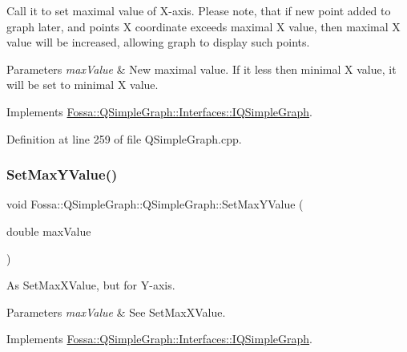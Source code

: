 Call it to set maximal value of X-\/axis. Please note, that if new point added to graph later, and point\textquotesingle{}s X coordinate exceeds maximal X value, then maximal X value will be increased, allowing graph to display such points. 


\begin{DoxyParams}{Parameters}
{\em max\+Value} & New maximal value. If it less then minimal X value, it will be set to minimal X value. \\
\hline
\end{DoxyParams}


Implements \hyperlink{class_fossa_1_1_q_simple_graph_1_1_interfaces_1_1_i_q_simple_graph_a04e7ec46c2be46257bef53c7bf978a2a}{Fossa\+::\+Q\+Simple\+Graph\+::\+Interfaces\+::\+I\+Q\+Simple\+Graph}.



Definition at line 259 of file Q\+Simple\+Graph.\+cpp.

\mbox{\label{class_fossa_1_1_q_simple_graph_1_1_q_simple_graph_a6cb6eee80dc489f300e32263833cf1cd}} 
\subsubsection{\texorpdfstring{Set\+Max\+Y\+Value()}{SetMaxYValue()}}
{\footnotesize\ttfamily void Fossa\+::\+Q\+Simple\+Graph\+::\+Q\+Simple\+Graph\+::\+Set\+Max\+Y\+Value (\begin{DoxyParamCaption}\item[{double}]{max\+Value }\end{DoxyParamCaption})\hspace{0.3cm}{\ttfamily [virtual]}}



As Set\+Max\+X\+Value, but for Y-\/axis. 


\begin{DoxyParams}{Parameters}
{\em max\+Value} & See Set\+Max\+X\+Value. \\
\hline
\end{DoxyParams}


Implements \hyperlink{class_fossa_1_1_q_simple_graph_1_1_interfaces_1_1_i_q_simple_graph_a09e04c116810e79ca1663d2075477746}{Fossa\+::\+Q\+Simple\+Graph\+::\+Interfaces\+::\+I\+Q\+Simple\+Graph}.



